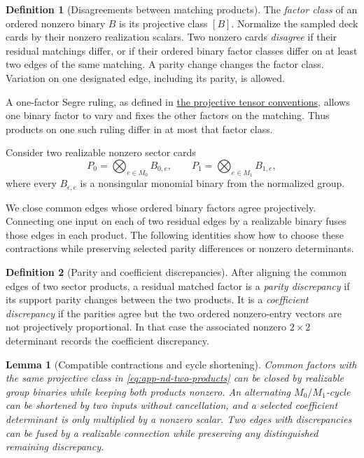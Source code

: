 \documentclass[11pt,letterpaper,onecolumn]{article}
\theoremstyle{plain}
\newtheorem{lemma}[lemma]{Lemma}
\theoremstyle{definition}
\newtheorem{definition}[definition]{Definition}
\theoremstyle{remark}
\begin{document}
\begin{definition}[Disagreements between matching products]
\label{def:nd-live-card-disagreement}
The \emph{factor class} of an ordered nonzero binary \(B\) is its
projective class \([B]\). Normalize the sampled deck cards by their
nonzero realization scalars. Two nonzero cards
\emph{disagree} if their residual matchings differ, or if their ordered
binary factor classes differ on at least two edges of the same
matching.  A parity change changes the factor class.  Variation on one designated edge, including its parity, is allowed.

A one-factor Segre ruling, as defined in
\hyperref[subsubsec:projective-tensor-geometry]{the projective tensor conventions}, allows one binary factor to
vary and fixes the other factors on the matching. Thus products on one
such ruling differ in at most that factor class.
\end{definition}

Consider two realizable nonzero sector cards
\begin{equation}
  P_0=\bigotimes_{e\in M_0}B_{0,e},
  \qquad
  P_1=\bigotimes_{e\in M_1}B_{1,e},
  \label{eq:app-nd-two-products}
\end{equation}
where every \(B_{\epsilon,e}\) is a nonsingular monomial binary from the
normalized group.

We close common edges whose ordered binary factors agree projectively.
Connecting one input on each of two residual edges by a realizable
binary fuses those edges in each product. The following identities show
how to choose these contractions while preserving selected parity
differences or nonzero determinants.

\begin{definition}[Parity and coefficient discrepancies]
\label{def:app-nd-tc-tag}
After aligning the common edges of two sector products, a residual matched
factor is a \emph{parity discrepancy} if its support parity changes between the two products.  It is a \emph{coefficient discrepancy} if the parities agree but the two
ordered nonzero-entry vectors are not projectively proportional. In that
case the associated nonzero \(2\times2\) determinant records the coefficient discrepancy.

\end{definition}

\begin{lemma}[Compatible contractions and cycle shortening]
\label{lem:app-nd-compatible-closure}
Common factors with the same projective class in \cref{eq:app-nd-two-products} can be closed by
realizable group binaries while keeping both products nonzero.  An alternating
\(M_0/M_1\)-cycle can be shortened by two inputs without cancellation, and
a selected coefficient determinant is only multiplied by a nonzero scalar.
Two edges with discrepancies can be fused by a realizable connection while preserving
any distinguished remaining discrepancy.
\end{lemma}
\end{document}
